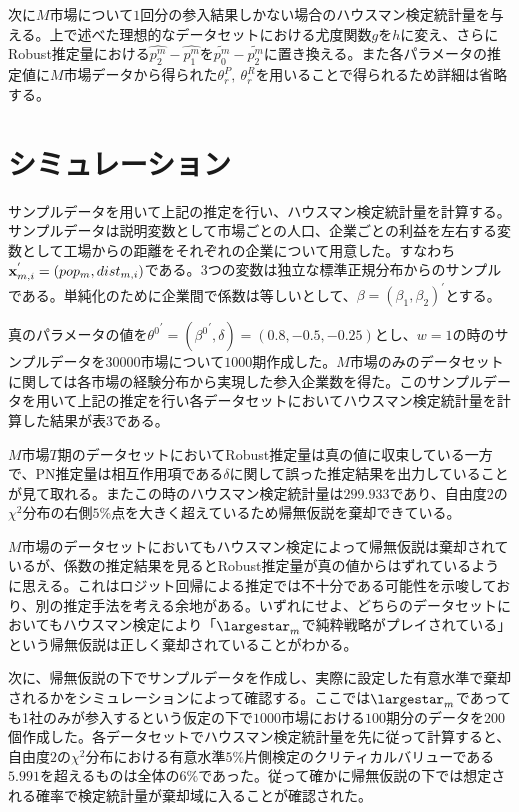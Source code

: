 次に$M$市場について$1$回分の参入結果しかない場合のハウスマン検定統計量を与える。上で述べた理想的なデータセットにおける尤度関数$g$を$h$に変え、さらにRobust推定量における$\hat{p_2^m} - \hat{p_1^m}$を$\tilde{p_0^m} - \tilde{p_2^m}$に置き換える。また各パラメータの推定値に$M$市場データから得られた$\theta_r^P,\ \theta_r^R$を用いることで得られるため詳細は省略する。

\section{シミュレーション}
サンプルデータを用いて上記の推定を行い、ハウスマン検定統計量を計算する。サンプルデータは説明変数として市場ごとの人口、企業ごとの利益を左右する変数として工場からの距離をそれぞれの企業について用意した。すなわち${\bf x}_{m, i}^{'} = (pop_m, dist_{m, i})$である。$3$つの変数は独立な標準正規分布からのサンプルである。単純化のために企業間で係数は等しいとして、$\beta = (\beta_1, \beta_2)^{'}$とする。

真のパラメータの値を${\theta^0}^{'} = ({\beta^0}^{'}, \delta) = (0.8, -0.5, -0.25)$とし、$w = 1$の時のサンプルデータを$30000$市場について$1000$期作成した。$M$市場のみのデータセットに関しては各市場の経験分布から実現した参入企業数を得た。このサンプルデータを用いて上記の推定を行い各データセットにおいてハウスマン検定統計量を計算した結果が表$3$である。

$M$市場$T$期のデータセットにおいてRobust推定量は真の値に収束している一方で、PN推定量は相互作用項である$\delta$に関して誤った推定結果を出力していることが見て取れる。またこの時のハウスマン検定統計量は$299.933$であり、自由度$2$の$\chi^2$分布の右側$5\%$点を大きく超えているため帰無仮説を棄却できている。

$M$市場のデータセットにおいてもハウスマン検定によって帰無仮説は棄却されているが、係数の推定結果を見るとRobust推定量が真の値からはずれているように思える。これはロジット回帰による推定では不十分である可能性を示唆しており、別の推定手法を考える余地がある。いずれにせよ、どちらのデータセットにおいてもハウスマン検定により「$\largestar_m$で純粋戦略がプレイされている」という帰無仮説は正しく棄却されていることがわかる。

次に、帰無仮説の下でサンプルデータを作成し、実際に設定した有意水準で棄却されるかをシミュレーションによって確認する。ここでは$\largestar_m$であっても1社のみが参入するという仮定の下で$1000$市場における$100$期分のデータを$200$個作成した。各データセットでハウスマン検定統計量を先に従って計算すると、自由度$2$の$\chi^2$分布における有意水準$5\%$片側検定のクリティカルバリューである$5.991$を超えるものは全体の$6\%$であった。従って確かに帰無仮説の下では想定される確率で検定統計量が棄却域に入ることが確認された。

